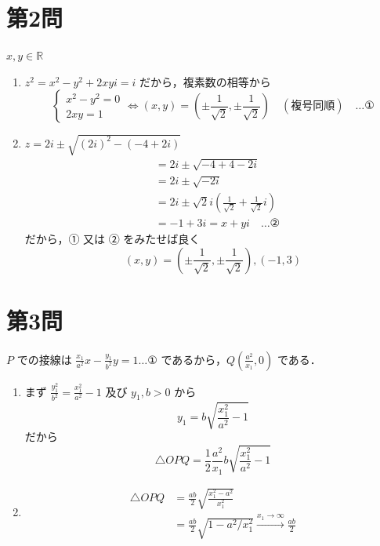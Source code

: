 \documentclass[../main.tex]{subfiles}
\begin{document}
\newpage

\section*{第2問}

\noindent
[\textbf{解}] $x, y \in \mathbb{R}$
\begin{enumerate}
  \item[(i)] $z^2 = x^2 - y^2 + 2xyi = i$ だから，複素数の相等から
    \[
      \begin{cases}
        x^2 - y^2 = 0 \\
        2xy = 1
      \end{cases}
      \iff (x, y) = \left( \pm \frac{1}{\sqrt{2}}, \pm \frac{1}{\sqrt{2}} \right) \quad (\text{複号同順}) \quad \dots \text{①}
    \]

  \item[(ii)] $z = 2i \pm \sqrt{(2i)^2 - (-4+2i)}$
    \[
      \begin{aligned}
        &= 2i \pm \sqrt{-4 + 4 - 2i} \\
        &= 2i \pm \sqrt{-2i} \\
        &= 2i \pm \sqrt{2}i \left( \frac{1}{\sqrt{2}} + \frac{1}{\sqrt{2}}i \right) \\
        &= -1 + 3i = x + yi \quad \dots \text{②}
      \end{aligned}
    \]
    だから，① 又は ② をみたせば良く
    \[
      (x, y) = \left( \pm \frac{1}{\sqrt{2}}, \pm \frac{1}{\sqrt{2}} \right), (-1, 3)
    \]
\end{enumerate}

\newpage

\section*{第3問}

\noindent
[\textbf{解}] $P$ での接線は $\frac{x_1}{a^2}x - \frac{y_1}{b^2}y = 1 \dots \text{①}$ であるから，$Q\left(\frac{a^2}{x_1}, 0\right)$ である．

\begin{enumerate}
  \item[(1)] まず $\frac{y_1^2}{b^2} = \frac{x_1^2}{a^2} - 1$ 及び $y_1, b > 0$ から
    \[
      y_1 = b \sqrt{\frac{x_1^2}{a^2} - 1}
    \]
    だから
    \[
      \triangle OPQ = \frac{1}{2} \frac{a^2}{x_1} b \sqrt{\frac{x_1^2}{a^2} - 1}
    \]

  \item[(2)]
    \[
      \begin{aligned}
        \triangle OPQ &= \frac{ab}{2} \sqrt{\frac{x_1^2 - a^2}{x_1^2}} \\
        &= \frac{ab}{2} \sqrt{1 - a^2 / x_1^2} \xrightarrow{x_1 \to \infty} \frac{ab}{2}
      \end{aligned}
    \]
\end{enumerate}
\end{document}
